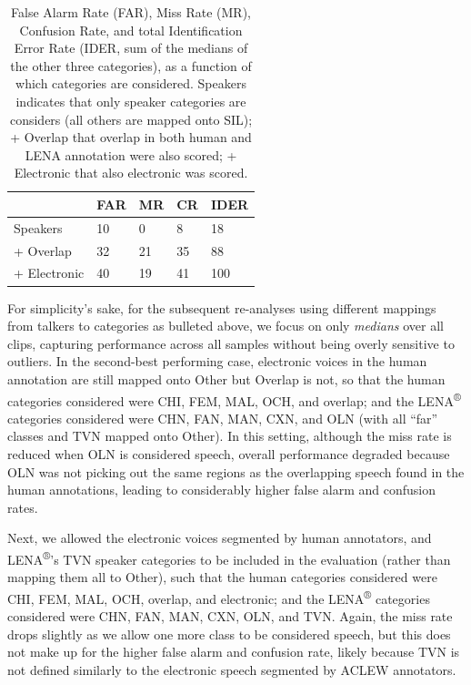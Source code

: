 \documentclass[english,table,man,floatsintext]{apa6}
\begin{document}
\begin{table}[tbp]

\begin{center}
\begin{threeparttable}

\caption{\label{tab:tabalts}False Alarm Rate (FAR), Miss Rate (MR), Confusion Rate, and total Identification Error Rate (IDER, sum of the medians of the other three categories), as a function of which categories are considered. Speakers indicates that only speaker categories are considers (all others are mapped onto SIL); + Overlap that overlap in both human and LENA annotation were also scored; + Electronic that also electronic was scored.}

\begin{tabular}{lllll}
\toprule
 & \multicolumn{1}{c}{FAR} & \multicolumn{1}{c}{MR} & \multicolumn{1}{c}{CR} & \multicolumn{1}{c}{IDER}\\
\midrule
Speakers & 10 & 0 & 8 & 18\\
+ Overlap & 32 & 21 & 35 & 88\\
+ Electronic & 40 & 19 & 41 & 100\\
\bottomrule
\end{tabular}

\end{threeparttable}
\end{center}

\end{table}

For simplicity's sake, for the subsequent re-analyses using different mappings from talkers to categories as bulleted above, we focus on only \emph{medians} over all clips, capturing performance across all samples without being overly sensitive to outliers. In the second-best performing case, electronic voices in the human annotation are still mapped onto Other but Overlap is not, so that the human categories considered were CHI, FEM, MAL, OCH, and overlap; and the LENA\textsuperscript{®} categories considered were CHN, FAN, MAN, CXN, and OLN (with all \enquote{far} classes and TVN mapped onto Other). In this setting, although the miss rate is reduced when OLN is considered speech, overall performance degraded because OLN was not picking out the same regions as the overlapping speech found in the human annotations, leading to considerably higher false alarm and confusion rates.

Next, we allowed the electronic voices segmented by human annotators, and LENA\textsuperscript{®}'s TVN speaker categories to be included in the evaluation (rather than mapping them all to Other), such that the human categories considered were CHI, FEM, MAL, OCH, overlap, and electronic; and the LENA\textsuperscript{®} categories considered were CHN, FAN, MAN, CXN, OLN, and TVN. Again, the miss rate drops slightly as we allow one more class to be considered speech, but this does not make up for the higher false alarm and confusion rate, likely because TVN is not defined similarly to the electronic speech segmented by ACLEW annotators.
\end{document}
